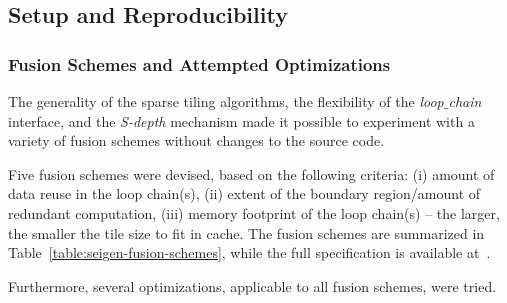 \subsection{Setup and Reproducibility}



\subsubsection{Fusion Schemes and Attempted Optimizations}
\label{sec:tiling:seigen:opts}
The generality of the sparse tiling algorithms, the flexibility of the {\em loop$\_$chain} interface, and the {\em S-depth} mechanism made it possible to experiment with a variety of fusion schemes without changes to the source code. 

Five fusion schemes were devised, based on the following criteria: (i) amount of data reuse in the loop chain(s), (ii) extent of the boundary region/amount of redundant computation, (iii) memory footprint of the loop chain(s) -- the larger, the smaller the tile size to fit in cache. The fusion schemes are summarized in Table~\ref{table:seigen-fusion-schemes}, while the full specification is available at~\cite{seigen-code}.

\begin{table}[htpb]
\footnotesize
\centering
{}
\caption{Summary of the fusion schemes adopted in Seigen. The {\em S-depth} column is to be interpreted as number of strips of off-process cells.}
\label{table:seigen-fusion-schemes}
\end{table}

Furthermore, several optimizations, applicable to all fusion schemes, were tried.

